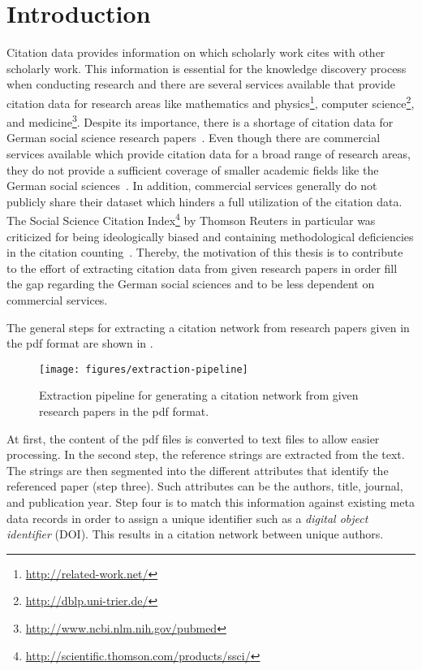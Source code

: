 \chapter{Introduction}\label{cha:introduction}


Citation data provides information on which scholarly work cites with other scholarly work.
This information is essential for the knowledge discovery process when conducting research and there are several services available that provide citation data for research areas like mathematics and physics\footnote{\url{http://related-work.net/}}, computer science\footnote{\url{http://dblp.uni-trier.de/}}, and medicine\footnote{\url{http://www.ncbi.nlm.nih.gov/pubmed}}.
Despite its importance, there is a shortage of citation data for German social science research papers~\citep{herb2015open}.
Even though there are commercial services available which provide citation data for a broad range of research areas, they do not provide a sufficient coverage of smaller academic fields like the German social sciences~\citep{mayr2007exploratory}.
In addition, commercial services generally do not publicly share their dataset which hinders a full utilization of the citation data.
The Social Science Citation Index\footnote{\url{http://scientific.thomson.com/products/ssci/}} by Thomson Reuters in particular was criticized for being ideologically biased and containing methodological deficiencies in the citation counting~\cite{klein2004social}.
Thereby, the motivation of this thesis is to contribute to the effort of extracting citation data from given research papers in order fill the gap regarding the German social sciences and to be less dependent on commercial services.

\bigskip

The general steps for extracting a citation network from research papers given in the \gls{pdf} format are shown in .
\begin{figure}[t]
\texttt{[image: figures/extraction-pipeline]}
\caption{Extraction pipeline for generating a citation network from given research papers in the \gls{pdf} format.}
\label{fig:extraction-pipeline}
\end{figure}
At first, the content of the \gls{pdf} files is converted to text files to allow easier processing.
In the second step, the reference strings are extracted from the text.
The strings are then segmented into the different attributes that identify the referenced paper (step three).
Such attributes can be the authors, title, journal, and publication year.
Step four is to match this information against existing meta data records in order to assign a unique identifier such as a \textit{digital object identifier} (DOI).
This results in a citation network between unique authors.

